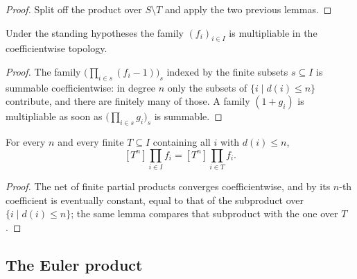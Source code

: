 \begin{proof}
  \leanok
  Split off the product over $S\setminus T$ and apply the two previous lemmas.
\end{proof}

\begin{lemma}[Multipliability]
  \label{lemma:weil-multipliable-of-X-pow-dvd-sub-one}
  \leanok

  Under the standing hypotheses the family $(f_i)_{i\in I}$ is multipliable in
  the coefficientwise topology.
\end{lemma}

\begin{proof}
  \leanok
  The family $\bigl(\prod_{i\in s}(f_i-1)\bigr)_{s}$ indexed by the finite
  subsets $s\subseteq I$ is summable coefficientwise: in degree $n$ only the
  subsets of $\{i\mid d(i)\le n\}$ contribute, and there are finitely many of
  those.  A family $(1+g_i)$ is multipliable as soon as
  $\bigl(\prod_{i\in s}g_i\bigr)_s$ is summable.
\end{proof}

\begin{lemma}
  \label{lemma:weil-coeff-tprod-eq-coeff-prod}
  \leanok

  For every $n$ and every finite $T\subseteq I$ containing all $i$ with
  $d(i)\le n$,
  \[
    [T^n]\prod_{i\in I}f_i=[T^n]\prod_{i\in T}f_i .
  \]
\end{lemma}

\begin{proof}
  \leanok
  The net of finite partial products converges coefficientwise, and by
   its $n$-th coefficient is eventually
  constant, equal to that of the subproduct over $\{i\mid d(i)\le n\}$; the
  same lemma compares that subproduct with the one over $T$.
\end{proof}

\subsection{The Euler product}

